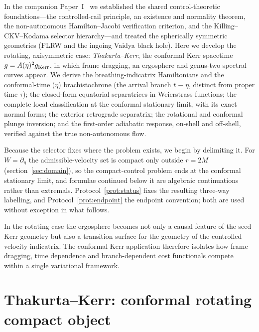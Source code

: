 \documentclass[12pt]{iopart}
\theoremstyle{plain}
\theoremstyle{definition}
\theoremstyle{remark}
\begin{document}
In the
companion Paper~I~\cite{PaperOne} we established the shared control-theoretic
foundations---the
controlled-rail principle, an existence and normality theorem, the non-autonomous
Hamilton--Jacobi verification criterion, and the Killing--CKV--Kodama selector
hierarchy---and treated the spherically symmetric geometries (FLRW and the ingoing Vaidya
black hole). Here we develop the rotating, axisymmetric case: \emph{Thakurta--Kerr}, the
conformal Kerr spacetime $g=A(\eta)^2 g_{\rm Kerr}$, in which frame dragging, an
ergosphere and genus-two spectral curves appear. We derive the breathing-indicatrix
Hamiltonians and the conformal-time ($\eta$) brachistochrone (the arrival branch
$t\equiv\eta$, distinct from proper time $\tau$); the closed-form equatorial separatrices
in Weierstrass functions; the complete local classification at the conformal stationary
limit, with its exact normal forms; the exterior retrograde separatrix; the rotational and
conformal plunge inversion; and the first-order adiabatic response, on-shell and
off-shell, verified against the true non-autonomous flow.

Because the selector fixes where the problem exists, we begin by delimiting it. For
$W=\partial_\eta$ the admissible-velocity set is compact only outside $r=2M$
(section~\ref{sec:domain}), so the compact-control problem ends at the conformal
stationary limit, and formulae continued below it are algebraic continuations rather than
extremals. Protocol~\ref{prot:status} fixes the resulting three-way labelling, and
Protocol~\ref{prot:endpoint} the endpoint convention; both are used without exception in
what follows.

In the rotating case the ergosphere becomes not only a causal feature of the seed Kerr
geometry but also a transition surface for the geometry of the controlled velocity
indicatrix. The conformal-Kerr application therefore isolates how frame dragging, time
dependence and branch-dependent cost functionals compete within a single variational
framework.

\section{Thakurta--Kerr: conformal rotating compact object}
\label{sec:thakurta}
\end{document}
